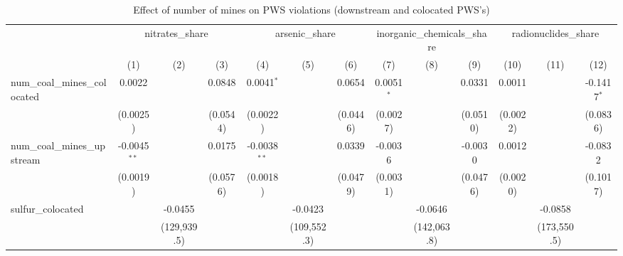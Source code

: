 
\begin{table}[htbp]
   \caption{\label{olsrf2sls_nummine_mine_vio_1985to2005dwnstrmcolocate} Effect of number of mines on PWS violations (downstream and colocated PWS's)}
   \bigskip
   \centering
   \begin{adjustbox}{width = \textwidth, center}
      \begin{tabular}{lcccccccccccc}
         \toprule
          & \multicolumn{3}{c}{nitrates\_share} & \multicolumn{3}{c}{arsenic\_share} & \multicolumn{3}{c}{inorganic\_chemicals\_share} & \multicolumn{3}{c}{radionuclides\_share}\\
                                                            & (1)            & (2)           & (3)           & (4)            & (5)           & (6)           & (7)           & (8)                   & (9)                   & (10)                  & (11)          & (12)\\  
         \midrule 
         num\_coal\_mines\_colocated                        & 0.0022         &               & 0.0848        & 0.0041$^{*}$   &               & 0.0654        & 0.0051$^{*}$  &                       & 0.0331                & 0.0011                &               & -0.1417$^{*}$\\   
                                                            & (0.0025)       &               & (0.0544)      & (0.0022)       &               & (0.0446)      & (0.0027)      &                       & (0.0510)              & (0.0022)              &               & (0.0836)\\   
         num\_coal\_mines\_upstream                         & -0.0045$^{**}$ &               & 0.0175        & -0.0038$^{**}$ &               & 0.0339        & -0.0036       &                       & -0.0030               & 0.0012                &               & -0.0832\\   
                                                            & (0.0019)       &               & (0.0576)      & (0.0018)       &               & (0.0479)      & (0.0031)      &                       & (0.0476)              & (0.0020)              &               & (0.1017)\\   
         sulfur\_colocated                                  &                & -0.0455       &               &                & -0.0423       &               &               & -0.0646               &                       &                       & -0.0858       &   \\   
                                                            &                & (129,939.5)   &               &                & (109,552.3)   &               &               & (142,063.8)           &                       &                       & (173,550.5)   &   \\   

\end{tabular}
\end{adjustbox}
\end{table}
